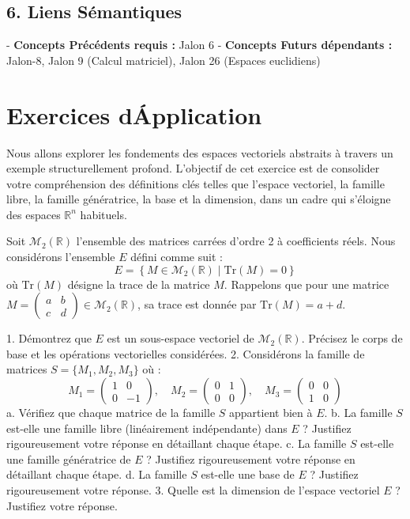 \documentclass{report}
\begin{document}
\section*{6. Liens Sémantiques}
- \textbf{Concepts Précédents requis :} Jalon 6
- \textbf{Concepts Futurs dépendants :} Jalon-8, Jalon 9 (Calcul matriciel), Jalon 26 (Espaces euclidiens)

\newpage
\chapter*{Exercices d\'Application}

Nous allons explorer les fondements des espaces vectoriels abstraits à travers un exemple structurellement profond. L'objectif de cet exercice est de consolider votre compréhension des définitions clés telles que l'espace vectoriel, la famille libre, la famille génératrice, la base et la dimension, dans un cadre qui s'éloigne des espaces $\mathbb{R}^n$ habituels.

Soit $\mathcal{M}_2(\mathbb{R})$ l'ensemble des matrices carrées d'ordre 2 à coefficients réels. Nous considérons l'ensemble $E$ défini comme suit :
$$ E = \left\{ M \in \mathcal{M}_2(\mathbb{R}) \mid \text{Tr}(M) = 0 \right\} $$
où $\text{Tr}(M)$ désigne la trace de la matrice $M$. Rappelons que pour une matrice $M = \begin{pmatrix} a & b \\ c & d \end{pmatrix} \in \mathcal{M}_2(\mathbb{R})$, sa trace est donnée par $\text{Tr}(M) = a+d$.

1.  Démontrez que $E$ est un sous-espace vectoriel de $\mathcal{M}_2(\mathbb{R})$. Précisez le corps de base et les opérations vectorielles considérées.
2.  Considérons la famille de matrices $S = \{M_1, M_2, M_3\}$ où :
    $$ M_1 = \begin{pmatrix} 1 & 0 \\ 0 & -1 \end{pmatrix}, \quad M_2 = \begin{pmatrix} 0 & 1 \\ 0 & 0 \end{pmatrix}, \quad M_3 = \begin{pmatrix} 0 & 0 \\ 1 & 0 \end{pmatrix} $$
    a.  Vérifiez que chaque matrice de la famille $S$ appartient bien à $E$.
    b.  La famille $S$ est-elle une famille libre (linéairement indépendante) dans $E$ ? Justifiez rigoureusement votre réponse en détaillant chaque étape.
    c.  La famille $S$ est-elle une famille génératrice de $E$ ? Justifiez rigoureusement votre réponse en détaillant chaque étape.
    d.  La famille $S$ est-elle une base de $E$ ? Justifiez rigoureusement votre réponse.
3.  Quelle est la dimension de l'espace vectoriel $E$ ? Justifiez votre réponse.
\end{document}
